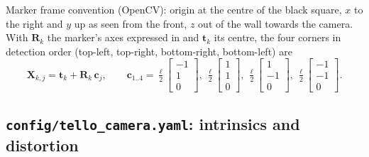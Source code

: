 Marker frame convention (OpenCV): origin at the centre of the black square, $x$ to the right and $y$ up as seen from
the front, $z$ out of the wall towards the camera. With $\mathbf R_k$ the marker's axes expressed in  and
$\mathbf t_k$ its centre, the four corners in detection order (top-left, top-right, bottom-right, bottom-left) are
\begin{equation}
\mathbf X_{k,j} = \mathbf t_k + \mathbf R_k \,\mathbf c_j,\qquad
\mathbf c_{1..4} = \tfrac{\ell}{2}\begin{bmatrix}-1\\1\\0\end{bmatrix},\
\tfrac{\ell}{2}\begin{bmatrix}1\\1\\0\end{bmatrix},\
\tfrac{\ell}{2}\begin{bmatrix}1\\-1\\0\end{bmatrix},\
\tfrac{\ell}{2}\begin{bmatrix}-1\\-1\\0\end{bmatrix}.
\label{eq:corners}
\end{equation}

\subsection{\texttt{config/tello\_camera.yaml}: intrinsics and distortion}

